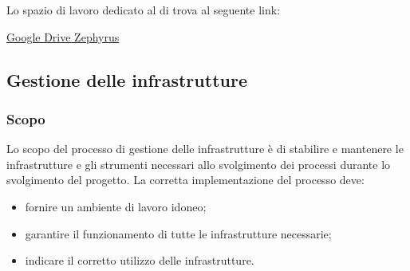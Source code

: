            Lo spazio di lavoro dedicato al  di trova al seguente link:
            \begin{center}
            	\href{https://drive.google.com/drive/folders/0Bzwj6VVb_wEeYkhoYkdzVW5qQnM?usp=sharing}{Google Drive Zephyrus}
            \end{center}

    \subsection{Gestione delle infrastrutture}
        \subsubsection{Scopo}
        Lo scopo del processo di gestione delle infrastrutture è di stabilire e mantenere le infrastrutture e gli strumenti necessari allo svolgimento dei processi durante lo svolgimento del progetto. La corretta implementazione del processo deve:
        \begin{itemize}
            \item fornire un ambiente di lavoro idoneo;
            \item garantire il funzionamento di tutte le infrastrutture necessarie;
            \item indicare il corretto utilizzo delle infrastrutture.
        \end{itemize}
